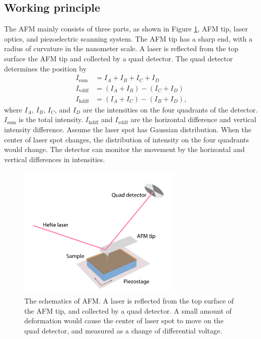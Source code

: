 \documentclass[pdflatex, sectionletters, 12pt]{pittetd}    %
\begin{document}
\subsection{Working principle}

The AFM mainly consists of three parts, as shown in Figure \ref{FIG:AFM}, AFM tip, laser optics, and piezoelectric scanning system. The AFM tip has a sharp end, with a radius of curvature in the nanometer scale. A laser is reflected from the top surface the AFM tip and collected by a quad detector. The quad detector determines the position by
\begin{equation}
\begin{split}
I_\mathrm{sum} & = I_A + I_B + I_C + I_D \\ 
I_\mathrm{vdiff} & = (I_A + I_B) - (I_C + I_D) \\ 
I_\mathrm{hdiff} & = (I_A + I_C) - (I_B + I_D),
\end{split}
\end{equation}
where $I_A$, $I_B$, $I_C$, and $I_D$ are the intensities on the four quadrants of the detector. $I_\mathrm{sum}$ is the total intensity. $I_\mathrm{hdiff}$ and $I_\mathrm{vdiff}$ are the horizontal difference and vertical intensity difference. Assume the laser spot has Gaussian distribution. When the center of laser spot changes, the distribution of intensity on the four quadrants would change. The detector can monitor the movement by the horizontal and vertical differences in intensities. 
\\

\begin{figure}[h!]
	\centering
	\includegraphics[width=0.7\textwidth]{Drawing/AFM.pdf}
	\caption{The schematics of AFM. A laser is reflected from the top surface of the AFM tip, and collected by a quad detector. A small amount of deformation would cause the center of laser spot to move on the quad detector, and measured as a change of differential voltage.}
	\label{FIG:AFM}
\end{figure}
\end{document}
